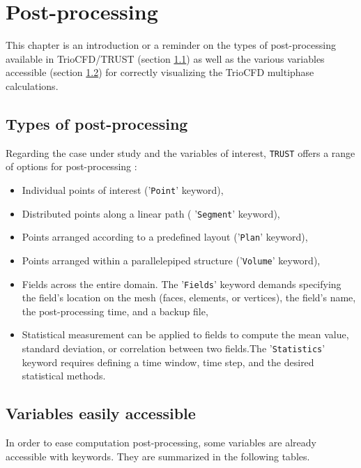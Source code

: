 \chapter{Post-processing}
\label{sec:postprocessing}
This chapter is an introduction or a reminder on the types of post-processing available in TrioCFD/TRUST (section \ref{post:type}) as well as the various variables accessible (section \ref{post:variables}) for correctly visualizing the TrioCFD multiphase calculations.
\section{Types of post-processing}\label{post:type}
Regarding the case under study and the variables of interest, \texttt{TRUST} offers a range of options for post-processing :
\begin{itemize}
      \item[\small \textcolor{blue}{\ding{109}}] Individual points of interest ('\texttt{Point}' keyword),
      \item[\small \textcolor{blue}{\ding{109}}] Distributed points along a linear path ( '\texttt{Segment}' keyword),
      \item[\small \textcolor{blue}{\ding{109}}] Points arranged according to a predefined layout ('\texttt{Plan}' keyword),
      \item[\small \textcolor{blue}{\ding{109}}] Points arranged within a parallelepiped structure ('\texttt{Volume}' keyword),
       \item[\small \textcolor{blue}{\ding{109}}] Fields across the entire domain. The '\texttt{Fields}' keyword demands specifying the field's location on the mesh (faces, elements, or vertices), the field's name, the post-processing time, and a backup file,
       \item[\small \textcolor{blue}{\ding{109}}] Statistical measurement can be applied to fields to compute the mean value, standard deviation, or correlation between two fields.The '\texttt{Statistics}' keyword requires defining a time window, time step, and the desired statistical methods.
\end{itemize}

\section{Variables easily accessible}\label{post:variables}
In order to ease computation post-processing, some variables are already accessible with keywords. They are summarized in the following tables.
 
